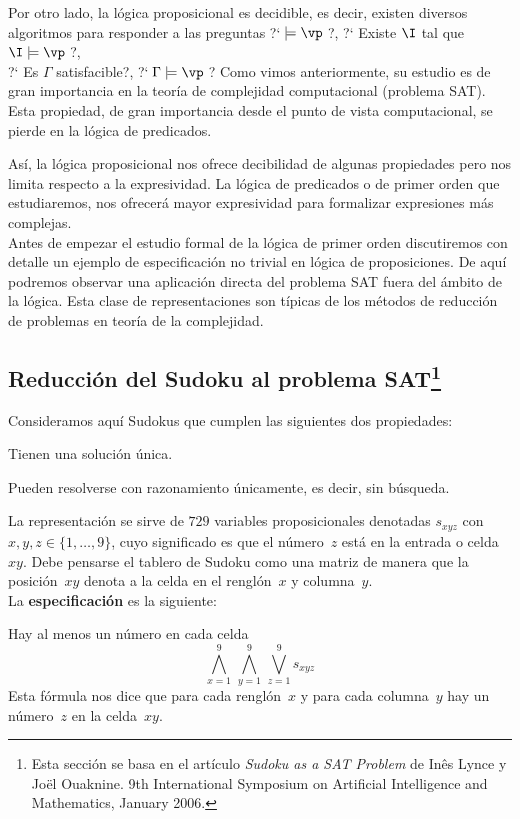 \documentclass[11pt,letterpaper]{article}
\begin{document}
\espc

Por otro lado, la lógica proposicional es decidible, es decir, existen
diversos algoritmos para responder a las preguntas 
\bc
?`$\;\models\vp\;$?, ?` Existe  $\I$ tal que $\I\models\vp\;$?,  \\
?` Es $\Gamma$ satisfacible?,  ?`$\;\Gamma\models\vp\;$?
\ec
Como vimos anteriormente, su estudio es de gran importancia en la teoría de 
complejidad computacional (problema {\sf SAT}).
Esta propiedad, de gran importancia desde el punto de vista computacional, se
pierde en la lógica de predicados.  

As\'i, la l\'ogica proposicional nos ofrece decibilidad de algunas propiedades 
pero nos limita respecto a la expresividad. La l\'ogica de predicados o de 
primer orden que estudiaremos, nos ofrecer\'a mayor expresividad para 
formalizar expresiones m\'as complejas.\\

Antes de empezar el estudio formal de la l\'ogica de primer orden discutiremos
con detalle un ejemplo de especificación no trivial en lógica de proposiciones. 
De aquí podremos observar una aplicación directa del problema {\sf SAT} fuera 
del ámbito de la lógica. Esta clase de representaciones son típicas de los 
métodos de reducción de problemas en teoría de la complejidad.

\newpage

\subsection{Reducción del Sudoku al problema {\sf SAT}\protect\footnote{
Esta sección se basa en el artículo \textit{Sudoku as a SAT Problem} de In\^es 
Lynce y Jo\"el Ouaknine. 9th International Symposium on Artificial Intelligence 
and Mathematics, January 2006.}}

\noindent Consideramos aquí Sudokus que cumplen las siguientes dos 
propiedades:
\be
\item Tienen una solución única.
\item Pueden resolverse con razonamiento únicamente, es decir, sin búsqueda.
\ee

La representación se sirve de $729$ variables proposicionales denotadas 
$s_{xyz}$ con $x,y,z\in\{1,\ldots,9\}$, cuyo significado es
que el número~$z$ está en la entrada o celda~$xy$. 
Debe pensarse el tablero de Sudoku como una matriz de manera que la 
posición~$xy$ denota a la celda en el renglón~$x$ y columna~$y$. \\
La \textbf{especificación} es la siguiente:
\bi
\item Hay al menos un número en cada celda
$$ \bigwedge_{x=1}^9\,\bigwedge_{y=1}^9\,\bigvee_{z=1}^9 s_{xyz} $$
Esta fórmula nos dice que para cada renglón~$x$ y para cada columna~$y$ hay un 
número~$z$ en la celda~$xy$.
\end{document}
